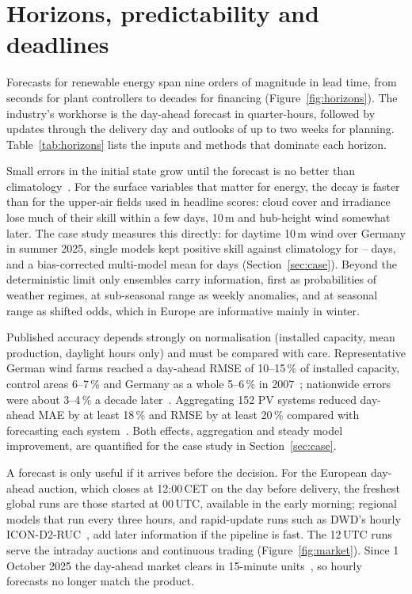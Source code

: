 \section{Horizons, predictability and deadlines}
\label{sec:horizons}

Forecasts for renewable energy span nine orders of magnitude in lead time, from seconds for plant controllers to decades for financing (Figure~\ref{fig:horizons}). The industry's workhorse is the day-ahead forecast in quarter-hours, followed by updates through the delivery day and outlooks of up to two weeks for planning. Table~\ref{tab:horizons} lists the inputs and methods that dominate each horizon.




 Small errors in the initial state grow until the forecast is no better than climatology~\cite{lorenz1963deterministic}. For the surface variables that matter for energy, the decay is faster than for the upper-air fields used in headline scores: cloud cover and irradiance lose much of their skill within a few days, 10\,m and hub-height wind somewhat later. The case study measures this directly: for daytime 10\,m wind over Germany in summer 2025, single models kept positive skill against climatology for \valWindGfsSkillZeroDays--\valWindAifsSkillZeroDays{} days, and a bias-corrected multi-model mean for \valWindMmmBcSkillZeroDays{} days (Section~\ref{sec:case}). Beyond the deterministic limit only ensembles carry information, first as probabilities of weather regimes, at sub-seasonal range as weekly anomalies, and at seasonal range as shifted odds, which in Europe are informative mainly in winter.

 Published accuracy depends strongly on normalisation (installed capacity, mean production, daylight hours only) and must be compared with care. Representative German wind farms reached a day-ahead RMSE of 10--15\,\% of installed capacity, control areas 6--7\,\% and Germany as a whole 5--6\,\% in 2007~\cite{ernst2007predicting}; nationwide errors were about 3--4\,\% a decade later~\cite{ubimet2016windsage}. Aggregating 152 PV systems reduced day-ahead MAE by at least 18\,\% and RMSE by at least 20\,\% compared with forecasting each system~\cite{visser2022aggregated}. Both effects, aggregation and steady model improvement, are quantified for the case study in Section~\ref{sec:case}.

 A forecast is only useful if it arrives before the decision. For the European day-ahead auction, which closes at 12:00\,CET on the day before delivery, the freshest global runs are those started at 00\,UTC, available in the early morning; regional models that run every three hours, and rapid-update runs such as DWD's hourly ICON-D2-RUC~\cite{wetterdienst2025ruc}, add later information if the pipeline is fast. The 12\,UTC runs serve the intraday auctions and continuous trading (Figure~\ref{fig:market}). Since 1 October 2025 the day-ahead market clears in 15-minute units~\cite{apg2025mtu}, so hourly forecasts no longer match the product.

